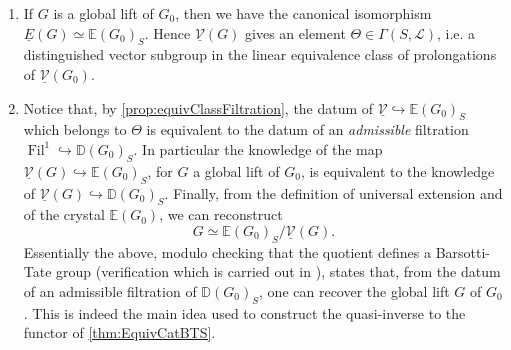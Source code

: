 \begin{rem}[]
\begin{enumerate}
	\item If $G$ is a global lift of $G_0$, then we have the canonical isomorphism
		$\underline{E}(G) \simeq \mathbb{E}(G_0)_S$.
		Hence $\underline{\mathcal{V}}(G)$ gives an element $\Theta \in \Gamma(S,\mathscr{L})$,
		i.e. a distinguished vector subgroup in the linear equivalence
		class of prolongations of $\underline{\mathcal{V}}(G_0)$.

	\item Notice that, by \cref{prop:equivClassFiltration}, the datum of 
		$\underline{\mathcal{V}} \hookrightarrow \mathbb{E}(G_0)_S$
		which belongs to $\Theta$ is
		equivalent to the datum of an \emph{admissible} filtration
		$\operatorname{Fil}^1 \hookrightarrow \mathbb{D}(G_0)_S$.
		In particular the knowledge of the map
		$\underline{\mathcal{V}}(G) \hookrightarrow \mathbb{E}(G_0)_S$, for $G$ a global
		lift of $G_0$, is equivalent to the knowledge of
		$\underline{\mathcal{V}}(G) \hookrightarrow \mathbb{D}(G_0)_S$.
		Finally, from the definition of universal extension
		and of the crystal $\mathbb{E}(G_0)$, we can reconstruct 
		\begin{equation*}
			G \simeq \mathbb{E}(G_0)_S/\underline{\mathcal{V}}(G)
		.\end{equation*}
		Essentially the above, modulo checking that the quotient defines
		a Barsotti-Tate group (verification which is carried out in
		\cite[Chapter V, theorem 1.6]{Messing}), states that, from 
		the datum of an admissible filtration of $\mathbb{D}(G_0)_S$,
		one can recover the global lift $G$ of $G_0$.
		This is indeed the main idea used to construct the quasi-inverse
		to the functor of \cref{thm:EquivCatBTS}.
\end{enumerate}
\end{rem}

